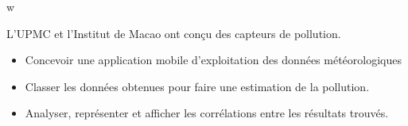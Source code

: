 w\documentclass[10pt,a4paper]{.altacv}
\begin{document}
\divider

L'UPMC et l'Institut de Macao ont conçu des capteurs de pollution.
\begin{itemize}
	\item Concevoir une application mobile d'exploitation des données météorologiques
	\item Classer les données obtenues pour faire une estimation de la pollution.
	\item Analyser, représenter et afficher les corrélations entre les résultats trouvés.
\end{itemize}




\end{document}
